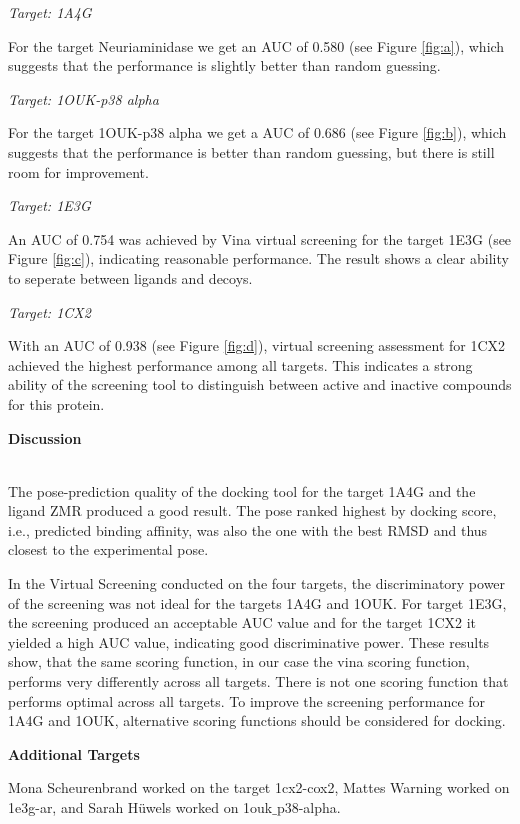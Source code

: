 \documentclass[a4paper,10pt]{article}
\begin{document}
\textit{Target: 1A4G} 

For the target Neuriaminidase we get an AUC of 0.580 (see Figure \ref{fig:a}), which suggests that the performance is slightly better than random guessing. 



\textit{Target: 1OUK-p38 alpha}


For the target 1OUK-p38 alpha we get a AUC of 0.686 (see Figure \ref{fig:b}), which suggests that the performance is better than random guessing, but there is still room for improvement.

\textit{Target: 1E3G}

An AUC of 0.754 was achieved by Vina virtual screening for the target 1E3G (see Figure \ref{fig:c}), indicating reasonable performance. The result shows a clear ability to seperate between ligands and decoys.

\textit{Target: 1CX2}

With an AUC of 0.938 (see Figure \ref{fig:d}), virtual screening assessment for 1CX2 achieved the highest performance among all targets. This indicates a strong ability of the screening tool to distinguish between active and inactive compounds for this protein.




\begin{large}
	\vspace{0.5cm}
	\textbf{Discussion}
\end{large}	\\ [1mm]

The pose-prediction quality of the docking tool for the target 1A4G and the ligand ZMR produced a good result. The pose ranked highest by docking score, i.e., predicted binding affinity, was also  the one with the best RMSD and thus closest to the experimental pose. 

In the Virtual Screening conducted on the four targets, the discriminatory power of the screening was not ideal for the targets 1A4G and 1OUK. For target 1E3G, the screening produced an acceptable AUC value and for the target 1CX2 it yielded a high AUC value, indicating good discriminative power. These results show, that the same scoring function, in our case the vina scoring function, performs very differently across all targets. There is not one scoring function that performs optimal across all targets. To improve the screening performance for 1A4G and 1OUK, alternative scoring functions should be considered for docking.




\textbf{Additional Targets}

Mona Scheurenbrand worked on the target 1cx2-cox2, Mattes Warning worked on 1e3g-ar, and Sarah Hüwels worked on 1ouk$\_$p38-alpha.



\end{document}
